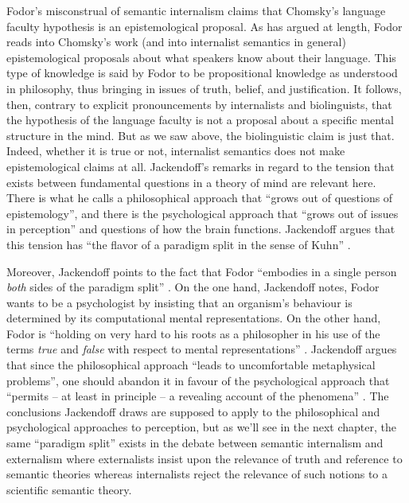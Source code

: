 Fodor’s misconstrual of semantic internalism claims that Chomsky’s language faculty hypothesis is an epistemological proposal. As \citet{Collins2004} has argued at length, Fodor reads into Chomsky’s work (and into internalist semantics in general) epistemological proposals about what speakers know about their language. This type of knowledge is said by Fodor to be propositional knowledge as understood in philosophy, thus bringing in issues of truth, belief, and justification. It follows, then, contrary to explicit pronouncements by internalists and biolinguists, that the hypothesis of the language faculty is not a proposal about a specific mental structure in the mind. But as we saw above, the biolinguistic claim is just that. Indeed, whether it is true or not, internalist semantics does not make epistemological claims at all. Jackendoff's remarks in regard to the tension that exists between fundamental questions in a theory of mind are relevant here. There is what he calls a philosophical approach that “grows out of questions of epistemology”, and there is the psychological approach that “grows out of issues in perception” and questions of how the brain functions. Jackendoff argues that this tension has “the flavor of a paradigm split in the sense of Kuhn” \citep[411-412]{Jackendoff1991}. 

Moreover, Jackendoff points to the fact that Fodor “embodies in a single person \textit{both} sides of the paradigm split” \citep[412, emphasis in original]{Jackendoff1991}. On the one hand, Jackendoff notes, Fodor wants to be a psychologist by insisting that an organism’s behaviour is determined by its computational mental representations. On the other hand, Fodor is “holding on very hard to his roots as a philosopher in his use of the terms \textit{true} and \textit{false} with respect to mental representations” \citep[412]{Jackendoff1991}. Jackendoff argues that since the philosophical approach “leads to uncomfortable metaphysical problems”, one should abandon it in favour of the psychological approach that “permits – at least in principle – a revealing account of the phenomena” \citep[416]{Jackendoff1991}. The conclusions Jackendoff draws are supposed to apply to the philosophical and psychological approaches to perception, but as we’ll see in the next chapter, the same “paradigm split” exists in the debate between semantic internalism and externalism where externalists insist upon the relevance of truth and reference to semantic theories whereas internalists reject the relevance of such notions to a scientific semantic theory. 

